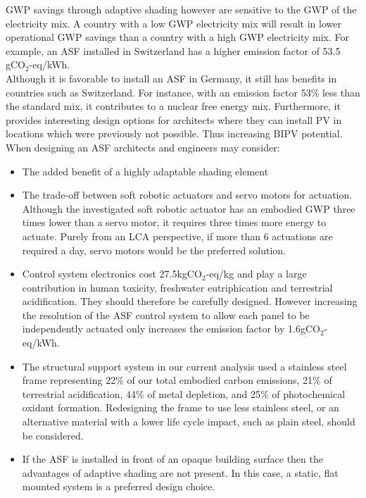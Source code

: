 GWP savings through adaptive shading however are sensitive to the GWP of the electricity mix. A country with a low GWP electricity mix will result in lower operational GWP savings than a country with a high GWP electricity mix. For example, an ASF installed in Switzerland has a higher emission factor of 53.5 gCO$_{2}$-eq/kWh.\\

Although it is favorable to install an ASF in Germany, it still has benefits in countries such as Switzerland. For instance, with an emission factor 53\% less than the standard mix, it contributes to a nuclear free energy mix. Furthermore, it provides interesting design options for architects where they can install PV in locations which were previously not possible. Thus increasing BIPV potential.\\

When designing an ASF architects and engineers may consider: 
\begin{itemize}
\item The added benefit of a highly adaptable shading element
\item The trade-off between soft robotic actuators and servo motors for actuation. Although the investigated soft robotic actuator has an embodied GWP three times lower than a servo motor, it requires three times more energy to actuate. Purely from an LCA perspective, if more than 6 actuations are required a day, servo motors would be the preferred solution. 
\item Control system electronics cost 27.5kgCO$_{2}$-eq/kg and play a large contribution in human toxicity, freshwater eutriphication and terrestrial acidification. They should therefore be carefully designed. However increasing the resolution of the ASF control system to allow each panel to be independently actuated only increases the emission factor by 1.6gCO$_{2}$-eq/kWh.
\item The structural support system in our current analysis used a stainless steel frame representing 22\% of our total embodied carbon emissions, 21\% of terrestrial acidification, 44\% of metal depletion, and 25\% of photochemical oxidant formation. Redesigning the frame to use less stainless steel, or an alternative material with a lower life cycle impact, such as plain steel, should be considered.
\item If the ASF is installed in front of an opaque building surface then the advantages of adaptive shading are not present. In this case, a static, flat mounted system is a preferred design choice. 
\end{itemize}
 
